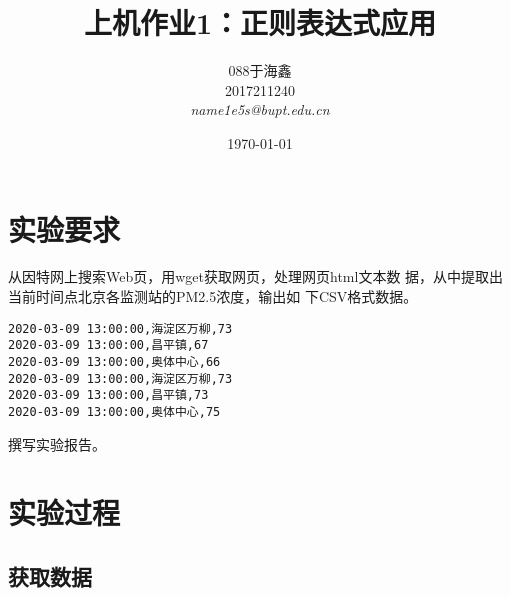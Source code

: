 \documentclass[blue,normal,cn]{elegantnote}
\title{上机作业1：正则表达式应用}
\date{\today}
\begin{document}
\author{
\begin{tabular}[t]{c} 
    088于海鑫 \\
    2017211240 \\
    \emph{name1e5s@bupt.edu.cn}
\end{tabular}
}
\maketitle

\section{实验要求}

从因特网上搜索Web页，用wget获取网页，处理网页html文本数
据，从中提取出当前时间点北京各监测站的PM2.5浓度，输出如
下CSV格式数据。
\begin{lstlisting}
2020-03-09 13:00:00,海淀区万柳,73
2020-03-09 13:00:00,昌平镇,67
2020-03-09 13:00:00,奥体中心,66
2020-03-09 13:00:00,海淀区万柳,73
2020-03-09 13:00:00,昌平镇,73
2020-03-09 13:00:00,奥体中心,75
\end{lstlisting}
撰写实验报告。

\section{实验过程}

\subsection{获取数据}
\end{document}
